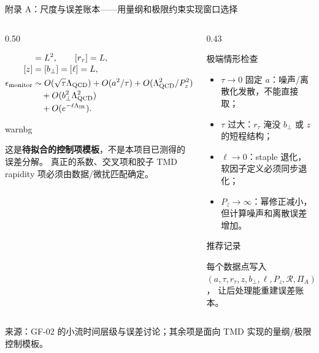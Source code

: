 \documentclass[UTF8,aspectratio=169,11pt]{ctexbeamer}
\newcommand{\source}[1]{%
  \par\vspace{0.05em}%
  {\raggedright\scriptsize\color{muted}来源：#1\par}}
\begin{document}
\appendix

\begin{frame}[t]{附录 A：尺度与误差账本——用量纲和极限约束实现窗口选择}
  \begin{columns}[T,totalwidth=\textwidth]
    \begin{column}{0.50\textwidth}
      {\footnotesize
      \begin{align*}
        [\tau]&=L^2,\qquad [r_\tau]=L,\\[-0.2em]
        [z]&=[b_\perp]=[\ell]=L,\\
        \epsilon_{\rm monitor}
        &\sim O(\sqrt{\tau}\Lambda_{\rm QCD})
        +O(a^2/\tau)
        +O(\Lambda_{\rm QCD}^2/P_z^2)\\[-0.2em]
        &\quad+O(b_\perp^2\Lambda_{\rm QCD}^2)\\[-0.2em]
        &\quad+O(e^{-\ell\Lambda_{\rm IR}}).
      \end{align*}
      \begin{beamercolorbox}[wd=\linewidth,sep=0.55em,rounded=true]{warnbg}
        {\footnotesize
        这是\textbf{待拟合的控制项模板}，不是本项目已测得的误差分解。
        真正的系数、交叉项和胶子 TMD rapidity 项必须由数据/微扰匹配确定。\par}
      \end{beamercolorbox}\par}
    \end{column}
    \begin{column}{0.43\textwidth}
      \begin{block}{极端情形检查}
        {\footnotesize
        \begin{itemize}
          \setlength{\itemsep}{0.08em}
          \item $\tau\to0$ 固定 $a$：噪声/离散化发散，不能直接取；
          \item $\tau$ 过大：$r_\tau$ 淹没 $b_\perp$ 或 $z$ 的短程结构；
          \item $\ell\to0$：staple 退化，软因子定义必须同步退化；
          \item $P_z\to\infty$：幂修正减小，但计算噪声和离散误差增加。
        \end{itemize}\par}
      \end{block}
      \begin{block}{推荐记录}
        {\footnotesize
        每个数据点写入 $(a,\tau,r_\tau,z,b_\perp,\ell,P_z,\mathcal R,\Pi_A)$，
        让后处理能重建误差账本。\par}
      \end{block}
    \end{column}
  \end{columns}
  \source{GF-02 的小流时间层级与误差讨论；其余项是面向 TMD 实现的量纲/极限控制模板。}
\end{frame}
\end{document}
